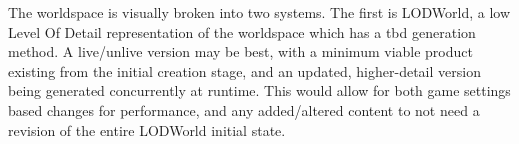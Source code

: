 The worldspace is visually broken into two systems. The first is LODWorld, a low Level Of Detail representation of the worldspace which has a tbd generation method. A live/unlive version may be best, with a minimum viable product existing from the initial creation stage, and an updated, higher-detail version being generated concurrently at runtime. This would allow for both game settings based changes for performance, and any added/altered content to not need a revision of the entire LODWorld initial state.